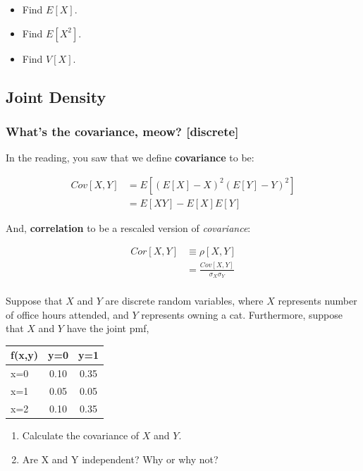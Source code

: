 \documentclass[
]{book}
\providecommand{\tightlist}{%
  \setlength{\itemsep}{0pt}\setlength{\parskip}{0pt}}
\theoremstyle{definition}
\theoremstyle{definition}
\theoremstyle{definition}
\theoremstyle{definition}
\theoremstyle{remark}
\begin{document}
\begin{itemize}
\tightlist
\item
  Find \(E[X]\).
\item
  Find \(E[X^2]\).
\item
  Find \(V[X]\).
\end{itemize}

\hypertarget{joint-density-1}{%
\subsection{Joint Density}\label{joint-density-1}}

\hypertarget{whats-the-covariance-meow-discrete}{%
\subsubsection{What's the covariance, meow? {[}discrete{]}}\label{whats-the-covariance-meow-discrete}}

In the reading, you saw that we define \textbf{covariance} to be:

\[
\begin{aligned}
Cov[X,Y]    &= E[(E[X] - X)^{2}(E[Y] - Y)^{2}] \\ 
            &= E[XY] - E[X]E[Y]
\end{aligned} 
\]

And, \textbf{correlation} to be a rescaled version of \emph{covariance}:

\[
\begin{aligned}
Cor[X,Y]    & \equiv \rho[X,Y] \\ 
            & = \frac{Cov[X,Y]}{\sigma_{X}\sigma_{Y}} \\
\end{aligned}            
\]

Suppose that \(X\) and \(Y\) are discrete random variables, where \(X\) represents number of office hours attended, and \(Y\) represents owning a cat. Furthermore, suppose that \(X\) and \(Y\) have the joint pmf,

\begin{longtable}[]{@{}lcc@{}}
\toprule
f(x,y) & y=0 & y=1 \\
\midrule
\endhead
x=0 & 0.10 & 0.35 \\
x=1 & 0.05 & 0.05 \\
x=2 & 0.10 & 0.35 \\
\bottomrule
\end{longtable}

\begin{enumerate}
\def\labelenumi{\arabic{enumi}.}
\tightlist
\item
  Calculate the covariance of \(X\) and \(Y\).
\item
  Are X and Y independent? Why or why not?
\end{enumerate}
\end{document}
